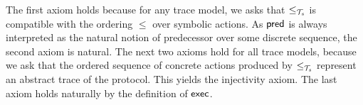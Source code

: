 The first axiom holds because for any trace model, we asks that $\leq_{\mathcal{T}_s}$ is compatible with the ordering $\leq$ over symbolic actions.
As $\textsf{pred}$ is always interpreted as the natural notion of predecessor over some discrete sequence, the second axiom is natural. The next two axioms hold for all trace models, because we ask that the ordered sequence of concrete actions produced by $\leq_{\mathcal{T}_s}$ represent an abstract trace of the protocol. This yields the injectivity axiom. The last axiom holds naturally by the definition of $\textsf{exec}$.

